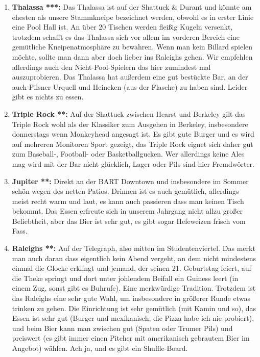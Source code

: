 \documentclass[a4paper]{scrreprt}
\begin{document}
\begin{enumerate}

  \item \textbf{Thalassa ***:} Das Thalassa ist auf der Shattuck \& Durant und könnte am ehesten als unsere Stammkneipe bezeichnet werden, obwohl es in erster Linie eine Pool Hall ist. An über 20 Tischen werden fleißig Kugeln versenkt, trotzdem schafft es das Thalassa sich vor allem im vorderen Bereich eine gemütliche Kneipenatmosphäre zu bewahren. Wenn man kein Billard spielen möchte, sollte man dann aber doch lieber ins Raleighs gehen. Wir empfehlen allerdings auch den Nicht-Pool-Spielern das hier zumindest mal auszuprobieren. Das Thalassa hat außerdem eine gut bestückte Bar, an der auch Pilsner Urquell und Heineken (aus der Flasche) zu haben sind. Leider gibt es nichts zu essen.

  \item \textbf{Triple Rock **:} Auf der Shattuck zwischen Hearst und Berkeley gilt das Triple Rock wohl als der Klassiker zum Ausgehen in Berkeley, insbesondere donnerstags wenn Monkeyhead angesagt ist. Es gibt gute Burger und es wird auf mehreren Monitoren Sport gezeigt, das Triple Rock eignet sich daher gut zum Baseball-, Football- oder Basketballgucken. Wer allerdings keine Ales mag wird mit der Bar nicht glücklich, Lager oder Pils sind hier Fremdwörter.
  
  \item \textbf{Jupiter **:} Direkt an der BART Downtown und insbesondere im Sommer schön wegen des netten Patios. Drinnen ist es auch gemütlich, allerdings meist recht warm und laut, es kann auch passieren dass man keinen Tisch bekommt. Das Essen erfreute sich in unserem Jahrgang nicht allzu großer Beliebtheit, aber das Bier ist sehr gut, es gibt sogar Hefeweizen frisch vom Fass.
  
  \item \textbf{Raleighs **:} Auf der Telegraph, also mitten im Studentenviertel. Das merkt man auch daran dass eigentlich kein Abend vergeht, an dem nicht mindestens einmal die Glocke erklingt und jemand, der seinen 21. Geburtstag feiert, auf die Theke springt und dort unter johlendem Beifall ein Guiness leert (in einem Zug, sonst gibt es Buhrufe). Eine merkwürdige Tradition. Trotzdem ist das Raleighs eine sehr gute Wahl, um insbesondere in größerer Runde etwas trinken zu gehen. Die Einrichtung ist sehr gemütlich (mit Kamin und so), das Essen ist sehr gut (Burger und mexikanisch, die Pizza habe ich nie probiert), und beim Bier kann man zwischen gut (Spaten oder Trumer Pils) und preiswert (es gibt immer einen Pitcher mit amerikanisch gebrautem Bier im Angebot) wählen. Ach ja, und es gibt ein Shuffle-Board.
  

\end{enumerate}
\end{document}
